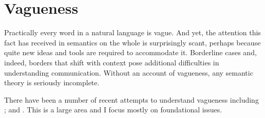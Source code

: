 \chapter{Vagueness}\label{ch:vagueness}

Practically every word in a natural language is vague. And yet, the attention this fact has received in semantics on the whole is surprisingly scant, perhaps because quite new ideas and tools are required to accommodate it. Borderline cases and, indeed, borders that shift with context pose additional difficulties in understanding communication. Without an account of vagueness, any semantic theory is seriously incomplete.

There have been a number of recent attempts to understand vagueness including \citet{ks:v,kdj:gtrv,pbl:crelc,lipman:wlv,ek:vlu,jager:vl,hj:tc}; and \citet{bb:iv}. This is a large area and I focus mostly on foundational issues.

%

% 
%
%
%
%
%
%
%

%

